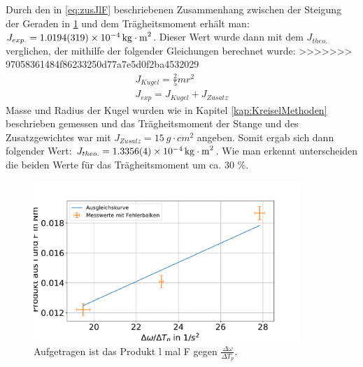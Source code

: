Durch den in \ref{eq:zusJlF} beschriebenen Zusammenhang zwischen der Steigung der Geraden in \cref{fig:Kreisel} und dem Trägheitsmoment erhält man:  $J_{exp.}=\SI{1,0194+-0,0319e-4}{kg \cdot m^2}$. 
Dieser Wert wurde dann mit dem $J_{theo.}$ verglichen, der mithilfe der folgender Gleichungen berechnet wurde:
>>>>>>> 97058361484f86233250d77a7e5d0f2ba4532029
\begin{align}
	J_{Kugel}=\frac{2}{5}mr^2\\
	J_{exp}=J_{Kugel}+J_{Zusatz}
	\label{eq:J}
\end{align}
Masse und Radius der Kugel wurden wie in Kapitel \ref{kap:KreiselMethoden} beschrieben gemessen und das Trägheitsmoment der Stange und des Zusatzgewichtes war mit $J_{Zusatz}=\SI{15}{g \cdot cm^2}$ angeben. Somit ergab sich dann folgender Wert: $J_{theo.}=\SI{1,3356+-0,0004e-4}{kg \cdot m^2}$. Wie man erkennt unterscheiden die beiden Werte für das Trägheitsmoment um ca. 30 \%.
\begin{figure}[h]
	\centering
	\includegraphics[width=0.9\textwidth]{res/wtgegenlF.pdf}
	\caption{Aufgetragen ist das Produkt l mal F gegen $\frac{\Delta \omega}{\Delta T_p }$.} 
	\label{fig:Kreisel}
\end{figure}
